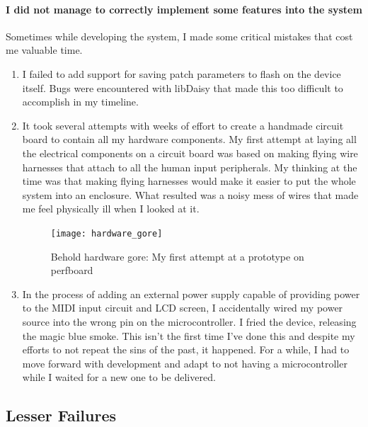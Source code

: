 \documentclass[acmlarge,screen]{acmart}
\begin{document}
	\paragraph{I did not manage to correctly implement some features into the system} Sometimes while developing the system, I made some critical mistakes that cost me valuable time.
	\begin{enumerate}
		\item I failed to add support for saving patch parameters to flash on the device itself. Bugs were encountered with libDaisy that made this too difficult to accomplish in my timeline.
		\item It took several attempts with weeks of effort to create a handmade circuit board to contain all my hardware components. My first attempt at laying all the electrical components on a circuit board was based on making flying wire harnesses that attach to all the human input peripherals. My thinking at the time was that making flying harnesses would make it easier to put the whole system into an enclosure. What resulted was a noisy mess of wires that made me feel physically ill when I looked at it.
		\begin{figure}[H]
			\texttt{[image: hardware\_gore]}
			\caption{Behold hardware gore: My first attempt at a prototype on perfboard}
			\centering
		\end{figure}
		\item In the process of adding an external power supply capable of providing power to the MIDI input circuit and LCD screen, I accidentally wired my power source into the wrong pin on the microcontroller. I fried the device, releasing the magic blue smoke. This isn't the first time I've done this and despite my efforts to not repeat the sins of the past, it happened. For a while, I had to move forward with development and adapt to not having a microcontroller while I waited for a new one to be delivered.
	\end{enumerate} 
	
	\subsection{Lesser Failures}
\end{document}
